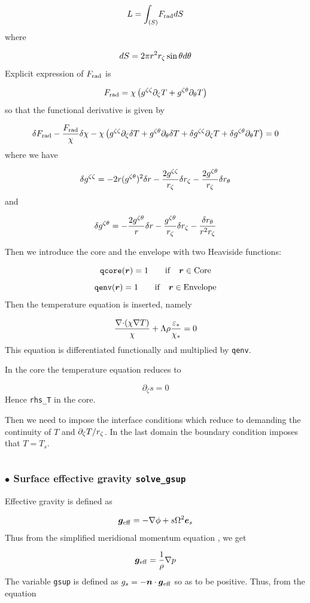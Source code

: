 \[ L= \int_{(S)}\! F_{\rm rad} dS\]
where

\[ dS = 2\pi r^2r_\zeta\sin\theta d\theta\]
Explicit expression of $F_{\rm rad}$ is

\[ F_{\rm rad} = \chi\left(g^{\zeta\zeta}\partial_\zeta T + g^{\zeta\theta}\partial_\theta T \right)\]
so that the functional derivative is given by

\[ \delta F_{\rm rad} -\frac{F_{\rm rad}}{\chi}\delta\chi -\chi\left(
g^{\zeta\zeta}\partial_\zeta\delta T + g^{\zeta\theta}\partial_\theta\delta T +
\delta g^{\zeta\zeta}\partial_\zeta T + \delta g^{\zeta\theta}\partial_\theta T\right) = 0\]
where we have

\[ \delta g^{\zeta\zeta} = -2r(g^{\zeta\theta})^2\delta r -\frac{2g^{\zeta\zeta}}{r_\zeta}\delta r_\zeta
-\frac{2g^{\zeta\theta}}{r_\zeta}\delta r_\theta\]
and

\[ \delta g^{\zeta\theta} = -\frac{2g^{\zeta\theta}}{r}\delta r -\frac{g^{\zeta\theta}}{r_\zeta}\delta r_\zeta
-\frac{\delta r_\theta}{r^2r_\zeta}\]

Then we introduce the core and the envelope with two Heaviside
functions:

\[ {\tt qcore}(\vr) = 1 \qquad {\rm if}\quad \vr \in {\rm Core}\]
\[ {\tt qenv}(\vr) = 1 \qquad {\rm if}\quad \vr \in {\rm Envelope}\]
Then the temperature equation is inserted, namely

\[ \frac{\displaystyle {\nabla\cdot}(\chi\nabla T)}{\chi} + \Lambda\rho\frac{\varepsilon_*}{\chi_*} = 0\]
This equation is differentiated functionally and multiplied by {\tt qenv}.

In the core the temperature equation reduces to

\[ \partial_\zeta s = 0\]
Hence {\tt rhs\_T} in the core.

Then we need to impose the interface conditions which reduce to
demanding the continuity of $T$ and $\partial_\zeta T/r_\zeta$. In the last
domain the boundary condition imposes that $T=T_s$.

\[ \]










\subsubsection{$\bullet$ \bf Surface effective gravity {\tt solve\_gsup}}

Effective gravity is defined as

\[ \vg_{\rm eff} = -\nabla\phi+s\Omega^2\es\]
Thus from the simplified meridional momentum equation , we get

\[ \vg_{\rm eff} = \frac{1}{\rho}\nabla p\]
The variable {\tt gsup} is defined as $g_s=-\vn\cdot\vg_{\rm eff}$ so as to be positive. Thus, from the equation

